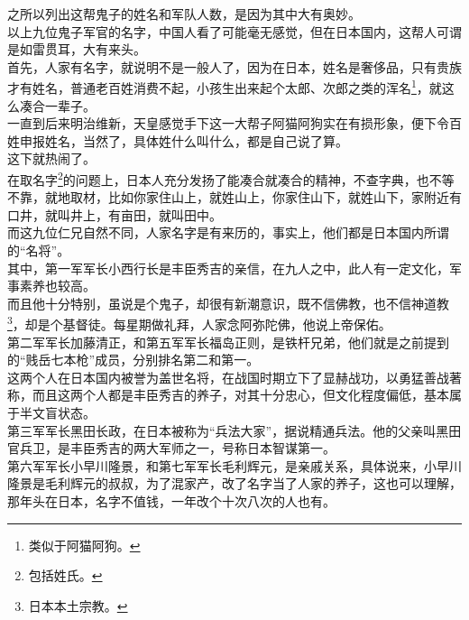 \begin{multicols}{\theparacolNo}
之所以列出这帮鬼子的姓名和军队人数，是因为其中大有奥妙。\\

以上九位鬼子军官的名字，中国人看了可能毫无感觉，但在日本国内，这帮人可谓是如雷贯耳，大有来头。\\

首先，人家有名字，就说明不是一般人了，因为在日本，姓名是奢侈品，只有贵族才有姓名，普通老百姓消费不起，小孩生出来起个太郎、次郎之类的浑名\footnote{类似于阿猫阿狗。}，就这么凑合一辈子。\\

一直到后来明治维新，天皇感觉手下这一大帮子阿猫阿狗实在有损形象，便下令百姓申报姓名，当然了，具体姓什么叫什么，都是自己说了算。\\

这下就热闹了。\\

在取名字\footnote{包括姓氏。}的问题上，日本人充分发扬了能凑合就凑合的精神，不查字典，也不等不靠，就地取材，比如你家住山上，就姓山上，你家住山下，就姓山下，家附近有口井，就叫井上，有亩田，就叫田中。\\

而这九位仁兄自然不同，人家名字是有来历的，事实上，他们都是日本国内所谓的“名将”。\\

其中，第一军军长小西行长是丰臣秀吉的亲信，在九人之中，此人有一定文化，军事素养也较高。\\

而且他十分特别，虽说是个鬼子，却很有新潮意识，既不信佛教，也不信神道教\footnote{日本本土宗教。}，却是个基督徒。每星期做礼拜，人家念阿弥陀佛，他说上帝保佑。\\

第二军军长加藤清正，和第五军军长福岛正则，是铁杆兄弟，他们就是之前提到的“贱岳七本枪”成员，分别排名第二和第一。\\

这两个人在日本国内被誉为盖世名将，在战国时期立下了显赫战功，以勇猛善战著称，而且这两个人都是丰臣秀吉的养子，对其十分忠心，但文化程度偏低，基本属于半文盲状态。\\

第三军军长黑田长政，在日本被称为“兵法大家”，据说精通兵法。他的父亲叫黑田官兵卫，是丰臣秀吉的两大军师之一，号称日本智谋第一。\\

第六军军长小早川隆景，和第七军军长毛利辉元，是亲戚关系，具体说来，小早川隆景是毛利辉元的叔叔，为了混家产，改了名字当了人家的养子，这也可以理解，那年头在日本，名字不值钱，一年改个十次八次的人也有。\\


\end{multicols}
